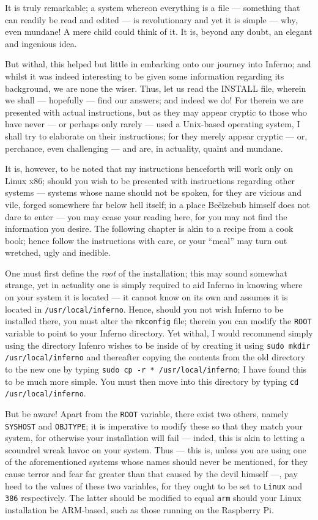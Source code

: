 \documentclass[a4paper,12pt]{report}
\begin{document}
  It is truly remarkable; a system whereon everything is a file — something that can readily be read and edited — is revolutionary and yet it is simple — why, even mundane! A mere child could think of it. It is, beyond any doubt, an elegant and ingenious idea.

  But withal, this helped but little in embarking onto our journey into Inferno; and whilst it was indeed interesting to be given some information regarding its background, we are none the wiser. Thus, let us read the INSTALL file, wherein we shall — hopefully — find our answers; and indeed we do!
  For therein we are presented with actual instructions, but as they may appear cryptic to those who have never — or perhaps only rarely — used a Unix-based operating system, I shall try to elaborate on their instructions; for they merely appear cryptic — or, perchance, even challenging — and are, in actuality, quaint and mundane.

  It is, however, to be noted that my instructions henceforth will work only on Linux x86; should you wish to be presented with instructions regarding other systems — systems whose name should not be spoken, for they are vicious and vile, forged somewhere far below hell itself; in a place Be\"{e}lzebub himself does not dare to enter — you may cease your reading here, for you may not find the information you desire. The following chapter is akin to a recipe from a cook book; hence follow the instructions with care, or your ``meal'' may turn out wretched, ugly and inedible.

  One must first define the \textit{root} of the installation; this may sound somewhat strange, yet in actuality one is simply required to aid Inferno in knowing where on your system it is located — it cannot know on its own and assumes it is located in \texttt{/usr/local/inferno}. Hence, should you not wish Inferno to be installed there, you must alter the \texttt{mkconfig} file; therein you can modify the \texttt{ROOT} variable to point to your Inferno directory.
  Yet withal, I would recommend simply using the directory Infenro wishes to be inside of by creating it using \texttt{sudo mkdir /usr/local/inferno} and thereafter copying the contents from the old directory to the new one by typing \texttt{sudo cp -r * /usr/local/inferno}; I have found this to be much more simple. You must then move into this directory by typing \texttt{cd /usr/local/inferno}.

  But be aware! Apart from the \texttt{ROOT} variable, there exist two others, namely \texttt{SYSHOST} and \texttt{OBJTYPE}; it is imperative to modify these so that they match your system, for otherwise your installation will fail — inded, this is akin to letting a scoundrel wreak havoc on your system. Thus — this is, unless you are using one of the aforementioned systems whose names should never be mentioned, for they cause terror and fear far greater than that caused by the devil himself —, pay heed to the values of these two variables, for they ought to be set to \texttt{Linux} and \texttt{386} respectively. The latter should be modified to equal \texttt{arm} should your Linux installation be ARM-based, such as those running on the Raspberry Pi.
\end{document}

